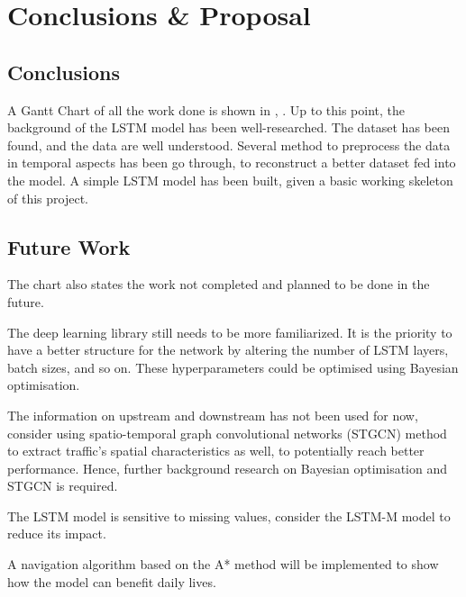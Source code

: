 \chapter{Conclusions \& Proposal} \label{Chapter: Conclusions}

\section{Conclusions}

A Gantt Chart of all the work done is shown in , .
Up to this point, the background of the LSTM model has been well-researched. The dataset has been found, and the data are well understood. 
Several method to preprocess the data in temporal aspects has been go through, to reconstruct a better dataset fed into the model. 
A simple LSTM model has been built, given a basic working skeleton of this project. 

\section{Future Work}

The chart also states the work not completed and planned to be done in the future.

The deep learning library still needs to be more familiarized. It is the priority to have a better structure for the network 
by altering the number of LSTM layers, batch sizes, and so on. These hyperparameters could be optimised using Bayesian optimisation. 

The information on upstream and downstream has not been used for now, consider using spatio-temporal graph convolutional networks (STGCN) method \cite{DBLP:journals/corr/abs-1709-04875}\cite{8560205} to extract 
traffic's spatial characteristics as well, to potentially reach better performance. Hence, further background research on Bayesian optimisation and STGCN is required. 

The LSTM model is sensitive to missing values, consider the LSTM-M model \cite{TIAN2018297} to reduce its impact.

A navigation algorithm based on the A* method will be implemented to show how the model can benefit daily lives. 